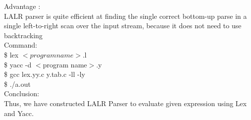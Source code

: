 \documentclass[11pt]{article}
\begin{document}
			\noindent
			Advantage :\\
			LALR parser is quite efficient at finding the single correct bottom-up parse in a single left-to-right scan over the input stream, because it does not need to use backtracking\\
			
			\noindent
			Command:\\
			\$ lex $<program name>.$l\\
			\$ yacc -d $<$program name$>.$y\\
			\$ gcc lex.yy.c y.tab.c -ll -ly\\
			\$ ./a.out\\
			
			\noindent
			Conclusion:\\
			Thus, we have constructed LALR Parser to evaluate given expression using Lex and Yacc.
			
\end{document}

